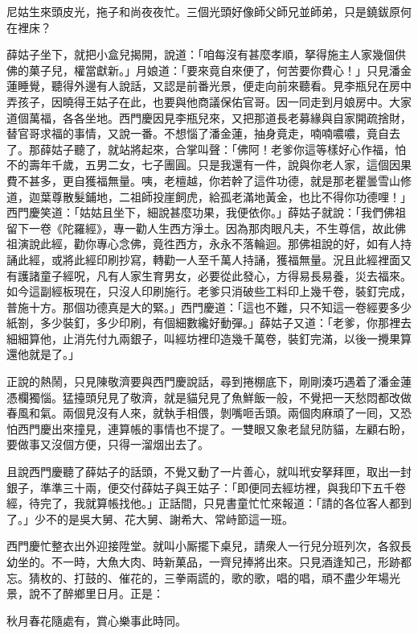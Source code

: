 尼姑生來頭皮光，拖子和尚夜夜忙。三個光頭好像師父師兄並師弟，{}只是鐃鈸原何在裡床？{}

薛姑子坐下，就把小盒兒揭開，說道：「咱每沒有甚麼孝順，拏得施主人家幾個供佛的菓子兒，權當獻新。」月娘道：「要來竟自來便了，何苦要你費心！」只見潘金蓮睡覺，聽得外邊有人說話，又認是前番光景，便走向前來聽看。見李瓶兒在房中弄孩子，因曉得王姑子在此，也要與他商議保佑官哥。因一同走到月娘房中。大家道個萬福，各各坐地。西門慶因見李瓶兒來，又把那道長老募緣與自家開疏捨財，替官哥求福的事情，又說一番。不想惱了潘金蓮，抽身竟走，喃喃噥噥，竟自去了。那薛姑子聽了，就站將起來，合掌叫聲：「佛阿！老爹你這等樣好心作福，怕不的壽年千歲，五男二女，七子團圓。只是我還有一件，說與你老人家，這個因果費不甚多，更自獲福無量。咦，老檀越，你若幹了這件功德，就是那老瞿曇雪山修道，迦葉尊散髮鋪地，二祖師投崖飼虎，給孤老滿地黃金，也比不得你功德哩！」西門慶笑道：「姑姑且坐下，細說甚麼功果，我便依你。」薛姑子就說：「我們佛祖留下一卷《陀羅經》，專一勸人生西方淨土。因為那肉眼凡夫，不生尊信，故此佛祖演說此經，勸你專心念佛，竟徃西方，永永不落輪迴。那佛祖說的好，如有人持誦此經，或將此經印刷抄寫，轉勸一人至千萬人持誦，獲福無量。況且此經裡面又有護諸童子經呪，凡有人家生育男女，必要從此發心，方得易長易養，災去福來。如今這副經板現在，只沒人印刷施行。老爹只消破些工料印上幾千卷，裝釘完成，普施十方。那個功德真是大的緊。」西門慶道：「這也不難，只不知這一卷經要多少紙劄，多少裝釘，多少印刷，有個細數纔好動彈。」薛姑子又道：「老爹，你那裡去細細算他，{}止消先付九兩銀子，叫經坊裡印造幾千萬卷，裝釘完滿，以後一攪果算還他就是了。」

正說的熱鬧，只見陳敬濟要與西門慶說話，尋到捲棚底下，剛剛湊巧遇着了潘金蓮憑欄獨惱。猛擡頭兒見了敬濟，就是貓兒見了魚鮮飯一般，不覺把一天愁悶都改做春風和氣。{}兩個見沒有人來，就執手相偎，剝嘴咂舌頭。兩個肉麻頑了一囘，又恐怕西門慶出來撞見，連算帳的事情也不提了。一雙眼又象老鼠兒防貓，左顧右盼，要做事又沒個方便，{}只得一溜烟出去了。

且說西門慶聽了薛姑子的話頭，不覺又動了一片善心，就叫玳安拏拜匣，取出一封銀子，準準三十兩，便交付薛姑子與王姑子：「即便同去經坊裡，與我印下五千卷經，待完了，我就算帳找他。」正話間，只見書童忙忙來報道：「請的各位客人都到了。」少不的是吳大舅、花大舅、謝希大、常峙節這一班。

西門慶忙整衣出外迎接陞堂。就叫小厮擺下桌兒，請衆人一行兒分班列次，各叙長幼坐的。不一時，大魚大肉、時新菓品，一齊兒捧將出來。只見酒逢知己，形跡都忘。猜枚的、打鼓的、催花的，三拳兩謊的，歌的歌，唱的唱，頑不盡少年場光景，說不了醉鄉里日月。{}正是：

秋月春花隨處有，賞心樂事此時同。

